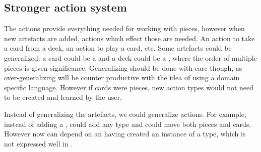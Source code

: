 \subsection{Stronger action system}
\label{sec:strongeractionsystem}

The actions provide everything needed for working with pieces, however
when new artefacts are added, actions which effect those are needed.
An action to take a card from a deck, an action to play a card, etc.
Some artefacts could be generalized: a card could be a 
and a deck could be a , where the order of multiple pieces
is given significance. Generalizing should be done with care though, as
over-generalizing will be counter productive with the idea of using a
domain specific language. However if cards were pieces, new action types
would not need to be created and learned by the user.

Instead of generalizing the artefacts, we could generalize actions. For example,
instead of  adding a ,  could add
any type and  could move both pieces and cards. However now
 can depend on an  having created an instance
of a type, which is not expressed well in .

